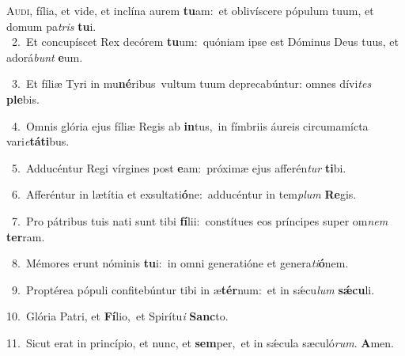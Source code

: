 \lettrine{\initial\textcolor{\initialcolor}{A}}{udi,} fília, et vide, et inclína aurem \textbf{tu}\-am:~\star et oblivíscere pópulum tuum, et domum pa\textit{tris} \textbf{tu}\-i.\\
{\numbfont\textcolor{\numbcolor}{~2.}}~Et concupíscet Rex decórem \textbf{tu}\-um:~\star quóniam ipse est Dóminus Deus tuus, et adorá\textit{bunt} \textbf{e}\-um.\par
{\numbfont\textcolor{\numbcolor}{~3.}}~Et fíliæ Tyri in mu\-\textbf{né}\-ribus~\star vultum tuum deprecabúntur: omnes dívi\textit{tes} \textbf{ple}\-bis.\par
{\numbfont\textcolor{\numbcolor}{~4.}}~Omnis glória ejus fíliæ Regis ab \textbf{in}\-tus,~\star in fímbriis áureis circumamícta vari\-\textit{e}\-\textbf{tá}\textbf{ti}bus.\par
{\numbfont\textcolor{\numbcolor}{~5.}}~Adducéntur Regi vírgines post \textbf{e}\-am:~\star próximæ ejus afferén\textit{tur} \textbf{ti}\-bi.\par
{\numbfont\textcolor{\numbcolor}{~6.}}~Afferéntur in lætítia et exsultati\-\textbf{ó}\-ne:~\star adducéntur in tem\textit{plum} \textbf{Re}\-gis.\par
{\numbfont\textcolor{\numbcolor}{~7.}}~Pro pátribus tuis nati sunt tibi \textbf{fí}\-lii:~\star constítues eos príncipes super om\textit{nem} \textbf{ter}\-ram.\par
{\numbfont\textcolor{\numbcolor}{~8.}}~Mémores erunt nóminis \textbf{tu}\-i:~\star in omni generatióne et genera\-\textit{ti}\-\textbf{ó}nem.\par
{\numbfont\textcolor{\numbcolor}{~9.}}~Proptérea pópuli confitebúntur tibi in æ\-\textbf{tér}\-num:~\star et in sǽcu\textit{lum} \textbf{sǽ}\-\textbf{cu}li.\par
{\numbfont\textcolor{\numbcolor}{10.}}~Glória Patri, et \textbf{Fí}\-lio,~\star et Spirítu\textit{i} \textbf{Sanc}\-to.\par
{\numbfont\textcolor{\numbcolor}{11.}}~Sicut erat in princípio, et nunc, et \textbf{sem}\-per,~\star et in sǽcula sæculó\-\textit{rum}\-. \textbf{A}\-men.\par
